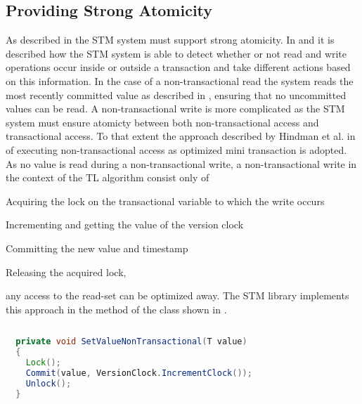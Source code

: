 \subsection{Providing Strong Atomicity}
\label{sec:stm_impl_providing_strong_atomicity}
As described in  the \ac{STM} system must support strong atomicity. In  and  it is described how the \ac{STM} system is able to detect whether or not read and write operations occur inside or outside a transaction and take different actions based on this information. In the case of a non-transactional read the system reads the most recently committed value as described in , ensuring that no uncommitted values can be read. A non-transactional write is more complicated as the \ac{STM} system must ensure atomicty between both non-transactional access and transactional access. To that extent the approach described by Hindman et al. in \cite{hindman2006atomicity} of executing non-transactional access as optimized mini transaction is adopted. As no value is read during a non-transactional write, a non-transactional write in the context of the TL algorithm consist only of 
\begin{inparaenum}[(1)]
\item Acquiring the lock on the transactional variable to which the write occurs
\item Incrementing and getting the value of the version clock
\item Committing the new value and timestamp
\item Releasing the acquired lock,
\end{inparaenum}
any access to the read-set can be optimized away. The \ac{STM} library implements this approach in the  method of the  class shown in .
\begin{lstlisting}[label=lst:library_non_trans_write,
  caption={Non-transactional Write},
  language=Java,  
  showspaces=false,
  showtabs=false,
  breaklines=true,
  showstringspaces=false,
  breakatwhitespace=true,
  commentstyle=\color{greencomments},
  keywordstyle=\color{bluekeywords},
  stringstyle=\color{redstrings},
  morekeywords={atomic, retry, orElse, var, get, set}]  % Start your code-block
  
  private void SetValueNonTransactional(T value)
  {
    Lock();
    Commit(value, VersionClock.IncrementClock());
    Unlock();
  }
\end{lstlisting}

